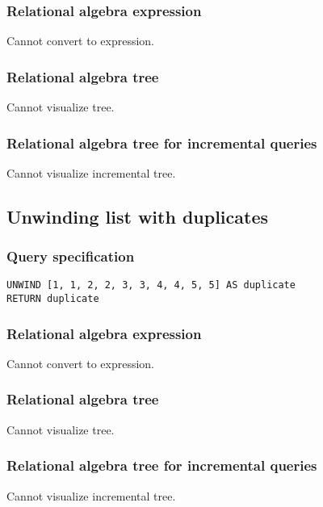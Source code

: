 \subsubsection*{Relational algebra expression}

Cannot convert to expression.

\subsubsection*{Relational algebra tree}

Cannot visualize tree.

\subsubsection*{Relational algebra tree for incremental queries}

Cannot visualize incremental tree.

\subsection{Unwinding list with duplicates}

\subsubsection*{Query specification}

\begin{lstlisting}
UNWIND [1, 1, 2, 2, 3, 3, 4, 4, 5, 5] AS duplicate
RETURN duplicate
\end{lstlisting}

\subsubsection*{Relational algebra expression}

Cannot convert to expression.

\subsubsection*{Relational algebra tree}

Cannot visualize tree.

\subsubsection*{Relational algebra tree for incremental queries}

Cannot visualize incremental tree.

